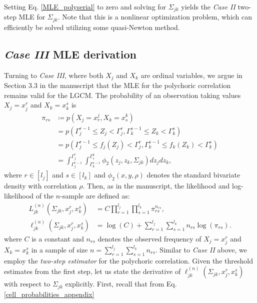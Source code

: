 Setting Eq. \eqref{MLE_polyserial} to zero and solving for $\Sigma_{jk}$ yields the \textit{Case II} two-step MLE for $\Sigma_{jk}$. Note that this is a nonlinear optimization problem, which can efficiently be solved utilizing some quasi-Newton method.


\subsection{\textit{Case III} MLE derivation}

Turning to \textit{Case III}, where both $X_j$ and $X_k$ are ordinal variables, we argue in Section 3.3 in the manuscript that the MLE for the polychoric correlation remains valid for the LGCM. The probability of an observation taking values $X_j = x^r_j$ and $X_k = x^s_k$ is
\begin{equation}\label{cell_probabilities_appendix}
    \begin{split}
        \pi_{rs} &\coloneqq p(X_j = x_r^j, X_k = x_s^k) \\
        &= p(\Gamma_j^{r-1} \leq Z_j < \Gamma_j^r, \Gamma_k^{s-1} \leq Z_k < \Gamma_k^s) \\
        &= p(\Gamma_j^{r-1} \leq f_j(Z_j) < \Gamma_j^r, \Gamma_k^{s-1} \leq f_k(Z_k) < \Gamma_k^s) \\
        &= \int_{\Gamma_j^{r-1}}^{\Gamma_j^{r}} \int_{\Gamma_k^{s-1}}^{\Gamma^k_{s}} \phi_2(z_j,z_k,\Sigma_{jk}) dz_j dz_k,
    \end{split}
\end{equation}
where $r \in [l_j]$ and $s \in [l_k]$ and $\phi_2(x,y,\rho)$ denotes the standard bivariate density with correlation $\rho$. Then, as in the manuscript, the likelihood and log-likelihood of the $n$-sample are defined as:
\begin{equation}\label{polychoric_likelihood_appendix}
    \begin{split}
        L_{jk}^{(n)}(\Sigma_{jk}, x_j^r,x_k^s) &= C \prod_{r=1}^{l_{{j}}} \prod_{s=1}^{l_{{k}}} \pi_{rs}^{n_{rs}}, \\
        \ell_{jk}^{(n)}(\Sigma_{jk}, x_j^r,x_k^s) &= \log(C) + \sum_{r=1}^{l_{{j}}}\sum_{s=1}^{l_{{k}}} n_{rs} \log(\pi_{rs}).
    \end{split}
\end{equation}
where $C$ is a constant and $n_{rs}$ denotes the observed frequency of $X_j = x^r_j$ and $X_k = x^s_k$ in a sample of size $n= \sum_{r=1}^{l_{{j}}}\sum_{s=1}^{l_{{k}}} n_{rs}$.
Similar to \textit{Case II} above, we employ the \textit{two-step estimator} for the polychoric correlation. Given the threshold estimates from the first step, let us state the derivative of $\ell_{jk}^{(n)}(\Sigma_{jk}, x_j^r,x_k^s)$ with respect to $\Sigma_{jk}$ explicitly. First, recall that from Eq. \eqref{cell_probabilities_appendix}
